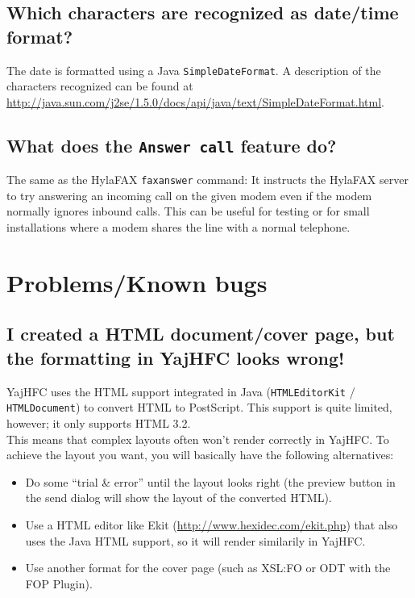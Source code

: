 \documentclass[a4paper,10pt]{scrartcl}
\begin{document}
\subsection{Which characters are recognized as date/time format?}

The date is formatted using a Java \texttt{SimpleDateFormat}. A description of the characters recognized can be found at \url{http://java.sun.com/j2se/1.5.0/docs/api/java/text/SimpleDateFormat.html}.

\subsection{What does the \texttt{Answer call} feature do?}

The same as the HylaFAX \verb#faxanswer# command: It instructs the HylaFAX server to try answering an incoming call on the given modem even if the modem normally ignores inbound calls. This can be useful for testing or for small installations where a modem shares the line with a normal telephone.

\section{Problems/Known bugs}

\subsection{I created a HTML document/cover page, but the formatting in YajHFC looks wrong!}

YajHFC uses the HTML support integrated in Java (\texttt{HTMLEditorKit} / \texttt{HTMLDocument}) to convert HTML to PostScript. This support is quite limited, however; it only supports HTML 3.2.\\
This means that complex layouts often won't render correctly in YajHFC.
To achieve the layout you want, you will basically have the following alternatives:

\begin{itemize}
 \item Do some ``trial \& error'' until the layout looks right (the preview button in the send dialog will show the layout of the converted HTML).
 \item Use a HTML editor like Ekit (\url{http://www.hexidec.com/ekit.php}) that also uses the Java HTML support, so it will render similarily in YajHFC.
 \item Use another format for the cover page (such as XSL:FO or ODT with the FOP Plugin).
\end{itemize}
\end{document}
